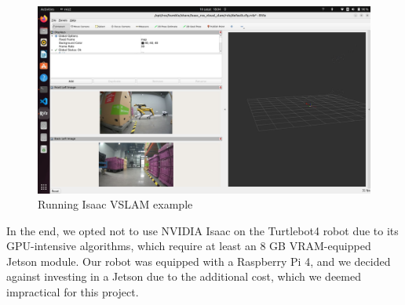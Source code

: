 \begin{figure}[htbp]
	\centering
	\includegraphics[width=150mm, keepaspectratio]{figures_jpg/isaac_vslam_example.jpg}
	\caption{Running Isaac VSLAM example}
	\label{fig:isaac_vslam_example}
\end{figure}

In the end, we opted not to use NVIDIA Isaac on the Turtlebot4 robot due to its GPU-intensive algorithms, which require at least an 8 GB VRAM-equipped Jetson module. Our robot was equipped with a Raspberry Pi 4, and we decided against investing in a Jetson due to the additional cost, which we deemed impractical for this project.
